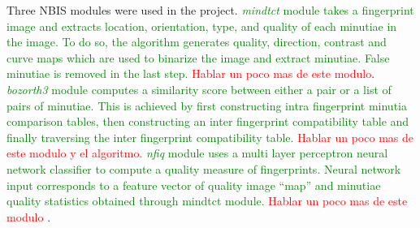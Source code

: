 \documentclass[a4paper,fleqn]{cas-dc}
\begin{document}
Three NBIS modules were used in the project. \textcolor{green}{\textit{mindtct} module takes a fingerprint image and extracts location, orientation, type, and quality of each minutiae in the image. To do so, the algorithm generates quality, direction, contrast and curve maps which are used to binarize the image and extract minutiae. False minutiae is removed in the last step.} \textcolor{red}{Hablar un poco mas de este modulo}. \textcolor{green}{\textit{bozorth3} module computes a similarity score between either a pair or a list of pairs of minutiae. This is achieved by first constructing intra fingerprint minutia comparison tables, then constructing an inter fingerprint compatibility table and finally traversing the inter fingerprint compatibility table.} \textcolor{red}{Hablar un poco mas de este modulo y el algoritmo.} \textcolor{green}{\textit{nfiq} module uses a multi layer perceptron neural network classifier to compute a quality measure of fingerprints. Neural network input corresponds to a feature vector of quality image “map” and minutiae quality statistics obtained through mindtct module.} \textcolor{red}{Hablar un poco mas de este modulo} \cite{UGNBIS}.
\end{document}
